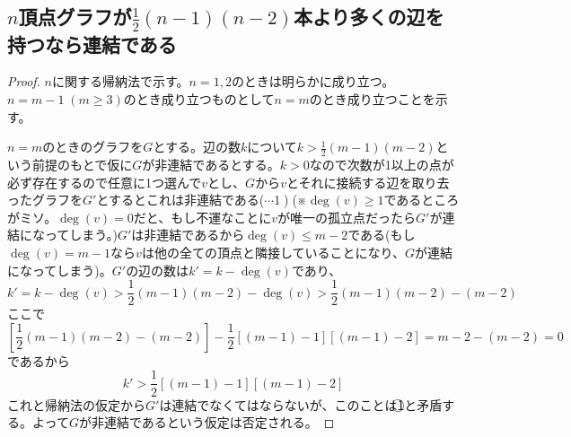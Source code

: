         \subsection{\texorpdfstring{$n$}{n}頂点グラフが\texorpdfstring{$\frac{1}{2}(n-1)(n-2)$}{(n-1)(n-2)/2}本より多くの辺を持つなら連結である}
            \begin{proof}
                \quad\par
                $n$に関する帰納法で示す。$n=1,2$のときは明らかに成り立つ。$n=m-1\;(m\geq3)$のとき成り立つものとして$n=m$のとき成り立つことを示す。
                \par
                $n=m$のときのグラフを$G$とする。辺の数$k$について$k>\frac{1}{2}(m-1)(m-2)$という前提のもとで仮に$G$が非連結であるとする。$k>0$なので次数が1以上の点が必ず存在するので任意に1つ選んで$v$とし、$G$から$v$とそれに接続する辺を取り去ったグラフを$G'$とするとこれは非連結である($\cdots$\textcircled{1})。(※$\deg(v)\geq1$であるところがミソ。$\deg(v)=0$だと、もし不運なことに$v$が唯一の孤立点だったら$G'$が連結になってしまう。)$G'$は非連結であるから$\deg(v)\leq m-2$である(もし$\deg(v)=m-1$なら$v$は他の全ての頂点と隣接していることになり、$G$が連結になってしまう)。$G'$の辺の数は$k'=k-\deg(v)$であり、
                \[k' = k-\deg(v) > \frac{1}{2}(m-1)(m-2) - \deg(v) > \frac{1}{2}(m-1)(m-2) - (m-2)\]
                ここで
                \[\left[\frac{1}{2}(m-1)(m-2) - (m-2)\right] - \frac{1}{2}[(m-1)-1][(m-1)-2] = m-2 - (m-2) = 0\]
                であるから
                \[k' > \frac{1}{2}[(m-1)-1][(m-1)-2]\]
                これと帰納法の仮定から$G'$は連結でなくてはならないが、このことは\textcircled{1}と矛盾する。よって$G$が非連結であるという仮定は否定される。
            \end{proof}
